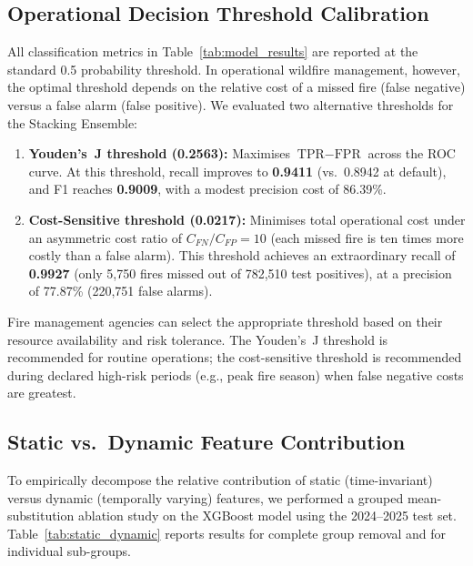 \documentclass[11pt]{article}
\begin{document}
\subsection{Operational Decision Threshold Calibration}
\label{sec:thresholds}

All classification metrics in Table~\ref{tab:model_results} are reported at the standard 0.5 probability threshold. In operational wildfire management, however, the optimal threshold depends on the relative cost of a missed fire (false negative) versus a false alarm (false positive). We evaluated two alternative thresholds for the Stacking Ensemble:

\begin{enumerate}
    \item \textbf{Youden's~J threshold (0.2563):} Maximises $\text{TPR} - \text{FPR}$ across the ROC curve. At this threshold, recall improves to \textbf{0.9411} (vs.\ 0.8942 at default), and F1 reaches \textbf{0.9009}, with a modest precision cost of 86.39\%.
    \item \textbf{Cost-Sensitive threshold (0.0217):} Minimises total operational cost under an asymmetric cost ratio of $C_{FN}/C_{FP} = 10$ (each missed fire is ten times more costly than a false alarm). This threshold achieves an extraordinary recall of \textbf{0.9927} (only 5,750 fires missed out of 782,510 test positives), at a precision of 77.87\% (220,751 false alarms).
\end{enumerate}

Fire management agencies can select the appropriate threshold based on their resource availability and risk tolerance. The Youden's~J threshold is recommended for routine operations; the cost-sensitive threshold is recommended during declared high-risk periods (e.g., peak fire season) when false negative costs are greatest.

\subsection{Static vs.\ Dynamic Feature Contribution}
\label{sec:static_dynamic}

To empirically decompose the relative contribution of static (time-invariant) versus dynamic (temporally varying) features, we performed a grouped mean-substitution ablation study on the XGBoost model using the 2024--2025 test set. Table~\ref{tab:static_dynamic} reports results for complete group removal and for individual sub-groups.
\end{document}
